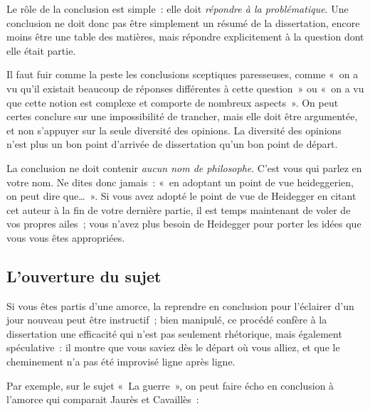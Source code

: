 \documentclass[a4paper]{article}
\begin{document}
Le rôle de la conclusion est simple : elle doit \emph{répondre à la
problématique}. Une conclusion ne doit donc pas être simplement un
résumé de la dissertation, encore moins être une table des matières,
mais répondre explicitement à la question dont elle était partie.

Il faut fuir comme la peste les conclusions sceptiques paresseuses,
comme « on a vu qu'il existait beaucoup de réponses différentes à cette
question » ou « on a vu que cette notion est complexe et comporte de
nombreux aspects ». On peut certes conclure sur une impossibilité de
trancher, mais elle doit être argumentée, et non s'appuyer sur la seule
diversité des opinions. La diversité des opinions n'est plus un bon
point d'arrivée de dissertation qu'un bon point de départ.

La conclusion ne doit contenir \emph{aucun nom de philosophe}. C'est vous qui
parlez en votre nom. Ne dites donc jamais : « en adoptant un point de vue
heideggerien, on peut dire que\ldots{} ». Si vous avez adopté le point de vue
de Heidegger en citant cet auteur à la fin de votre dernière partie, il
est temps maintenant de voler de vos propres ailes ; vous n'avez plus
besoin de Heidegger pour porter les idées que vous vous êtes
appropriées.

\subsection{L'ouverture du sujet}
\label{sec-4-2}

Si vous êtes partis d'une amorce, la reprendre en conclusion pour
l'éclairer d'un jour nouveau peut être instructif ; bien manipulé, ce
procédé confère à la dissertation une efficacité qui n'est pas seulement
rhétorique, mais également spéculative : il montre que vous saviez dès
le départ où vous alliez, et que le cheminement n'a pas été improvisé
ligne après ligne.

Par exemple, sur le sujet « La guerre », on peut faire écho en conclusion
à l'amorce qui comparait Jaurès et Cavaillès :
\end{document}
